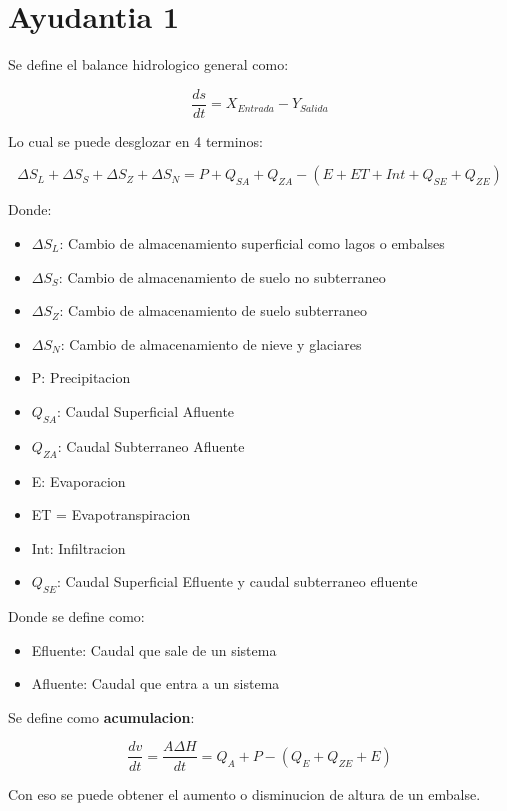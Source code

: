 \part{Ayudantia 1}

Se define el balance hidrologico general como:

\begin{equation}
    \frac{ds}{dt} = X_{Entrada}-Y_{Salida}
\end{equation}

Lo cual se puede desglozar en 4 terminos:

\begin{equation}
    \Delta S_L + \Delta S_S + \Delta S_Z + \Delta S_N = P + Q_{SA} + Q_{ZA} - (E +ET +Int + Q_{SE} + Q_{ZE})
\end{equation}

Donde:

\begin{itemize}
    \item $\Delta S_L$: Cambio de almacenamiento superficial como lagos o embalses
    \item $\Delta S_S$: Cambio de almacenamiento de suelo no subterraneo
    \item $\Delta S_Z$: Cambio de almacenamiento de suelo subterraneo
    \item $\Delta S_N$: Cambio de almacenamiento de nieve y glaciares
    \item P: Precipitacion
    \item $Q_{SA}$: Caudal Superficial Afluente
    \item $Q_{ZA}$: Caudal Subterraneo Afluente
    \item E: Evaporacion
    \item ET = Evapotranspiracion
    \item Int: Infiltracion
    \item $Q_{SE}$: Caudal Superficial Efluente y caudal subterraneo efluente
\end{itemize}

Donde se define como:

\begin{itemize}
    \item Efluente: Caudal que sale de un sistema
    \item Afluente: Caudal que entra a un sistema
\end{itemize}

Se define como \textbf{acumulacion}:

\begin{equation}
    \frac{dv}{dt} = \frac{A\Delta H}{dt}= Q_A + P - (Q_E + Q_{ZE} + E)
\end{equation}

Con eso se puede obtener el aumento o disminucion de altura de un embalse.